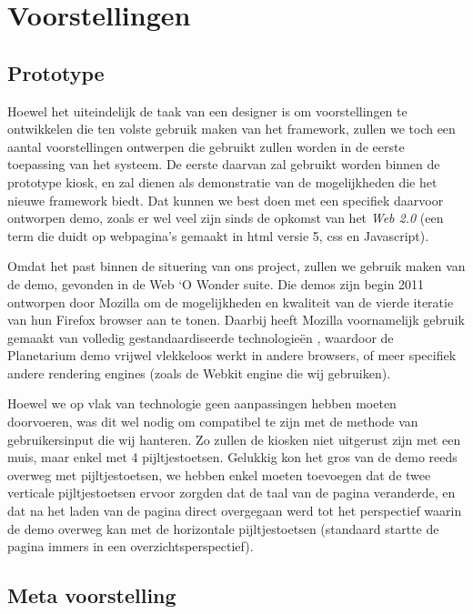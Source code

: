\part{Voorstellingen}
\label{voorstellingen}

\chapter{Prototype}
\label{voorstellingen:prototype}

Hoewel het uiteindelijk de taak van een designer is om voorstellingen te ontwikkelen die ten volste gebruik maken van het framework, zullen we toch een aantal voorstellingen ontwerpen die gebruikt zullen worden in de eerste toepassing van het systeem. De eerste daarvan zal gebruikt worden binnen de prototype kiosk, en zal dienen als demonstratie van de mogelijkheden die het nieuwe framework biedt. Dat kunnen we best doen met een specifiek daarvoor ontworpen demo, zoals er wel veel zijn sinds de opkomst van het \emph{Web 2.0} (een term die duidt op webpagina's gemaakt in \ac{html} versie 5, \ac{css} en Javascript).

Omdat het past binnen de situering van ons project, zullen we gebruik maken van de  demo, gevonden in de Web ‘O Wonder suite. Die demos zijn begin 2011 ontworpen door Mozilla om de mogelijkheden en kwaliteit van de vierde iteratie van hun Firefox browser aan te tonen. Daarbij heeft Mozilla voornamelijk gebruik gemaakt van volledig gestandaardiseerde technologieën \citep{webowonder}, waardoor de Planetarium demo vrijwel vlekkeloos werkt in andere browsers, of meer specifiek andere rendering engines (zoals de Webkit engine die wij gebruiken).

Hoewel we op vlak van technologie geen aanpassingen hebben moeten doorvoeren, was dit wel nodig om compatibel te zijn met de methode van gebruikersinput die wij hanteren. Zo zullen de kiosken niet uitgerust zijn met een muis, maar enkel met 4 pijltjestoetsen. Gelukkig kon het gros van de demo reeds overweg met pijltjestoetsen, we hebben enkel moeten toevoegen dat de twee verticale pijltjestoetsen ervoor zorgden dat de taal van de pagina veranderde, en dat na het laden van de pagina direct overgegaan werd tot het perspectief waarin de demo overweg kan met de horizontale pijltjestoetsen (standaard startte de pagina immers in een overzichtsperspectief).

\chapter{Meta voorstelling}
\label{voorstellingen:metavoorstelling}

